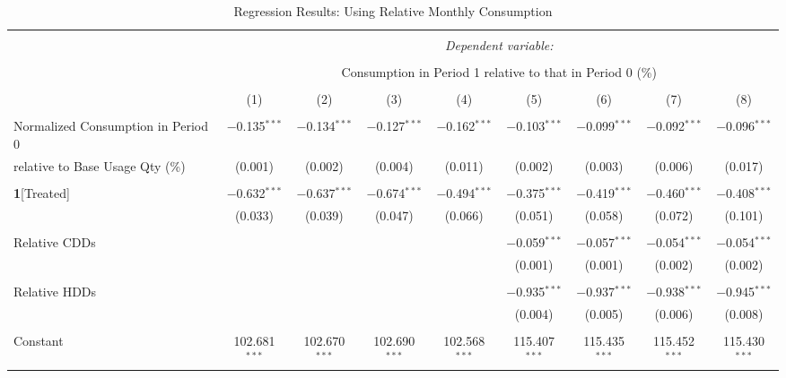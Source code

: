 \begin{sidewaystable}[!htbp]
\centering 
\caption{Regression Results: Using Relative Monthly Consumption} 
\label{Table:Regression-Results_Relative-Monthly-Average} 
\small 

\begin{adjustbox}{scale = 0.85}

\begin{tabular}{@{\extracolsep{5pt}}lcccccccc} 
\\[-1.8ex]\hline 
\hline \\[-1.8ex] 
 & \multicolumn{8}{c}{\textit{Dependent variable:}} \\ 
\cline{2-9} 
\\[-1.8ex] & \multicolumn{8}{c}{Consumption in Period 1 relative to that in Period 0 (\%)} \\ 
\\[-1.8ex] & (1) & (2) & (3) & (4) & (5) & (6) & (7) & (8)\\ 
\hline \\[-1.8ex] 
 Normalized Consumption in Period 0 & $-$0.135$^{***}$ & $-$0.134$^{***}$ & $-$0.127$^{***}$ & $-$0.162$^{***}$ & $-$0.103$^{***}$ & $-$0.099$^{***}$ & $-$0.092$^{***}$ & $-$0.096$^{***}$ \\ 
relative to Base Usage Qty (\%) & (0.001) & (0.002) & (0.004) & (0.011) & (0.002) & (0.003) & (0.006) & (0.017) \\ 
  & & & & & & & & \\ 
 \textbf{1}[Treated] & $-$0.632$^{***}$ & $-$0.637$^{***}$ & $-$0.674$^{***}$ & $-$0.494$^{***}$ & $-$0.375$^{***}$ & $-$0.419$^{***}$ & $-$0.460$^{***}$ & $-$0.408$^{***}$ \\ 
  & (0.033) & (0.039) & (0.047) & (0.066) & (0.051) & (0.058) & (0.072) & (0.101) \\ 
  & & & & & & & & \\ 
 Relative CDDs &  &  &  &  & $-$0.059$^{***}$ & $-$0.057$^{***}$ & $-$0.054$^{***}$ & $-$0.054$^{***}$ \\ 
  &  &  &  &  & (0.001) & (0.001) & (0.002) & (0.002) \\ 
  & & & & & & & & \\ 
 Relative HDDs &  &  &  &  & $-$0.935$^{***}$ & $-$0.937$^{***}$ & $-$0.938$^{***}$ & $-$0.945$^{***}$ \\ 
  &  &  &  &  & (0.004) & (0.005) & (0.006) & (0.008) \\ 
  & & & & & & & & \\ 
 Constant & 102.681$^{***}$ & 102.670$^{***}$ & 102.690$^{***}$ & 102.568$^{***}$ & 115.407$^{***}$ & 115.435$^{***}$ & 115.452$^{***}$ & 115.430$^{***}$ \\ 

\end{tabular}
\end{adjustbox}
\end{sidewaystable}
